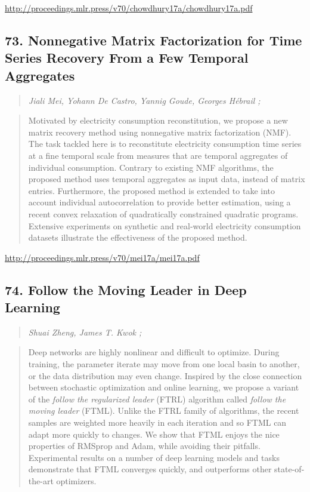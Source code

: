 \documentclass{article}
\begin{document}
\href{http://proceedings.mlr.press/v70/chowdhury17a/chowdhury17a.pdf}{http://proceedings.mlr.press/v70/chowdhury17a/chowdhury17a.pdf}

\subsection{73. Nonnegative Matrix Factorization for Time Series Recovery From a Few Temporal Aggregates}

\begin{quote}
\footnotesize{\textit{Jiali Mei, Yohann De Castro, Yannig Goude, Georges Hébrail ;}}

\end{quote}

\begin{quote}
    Motivated by electricity consumption reconstitution, we propose a new matrix recovery method using nonnegative matrix factorization (NMF). The task tackled here is to reconstitute electricity consumption time series at a fine temporal scale from measures that are temporal aggregates of individual consumption. Contrary to existing NMF algorithms, the proposed method uses temporal aggregates as input data, instead of matrix entries. Furthermore, the proposed method is extended to take into account individual autocorrelation to provide better estimation, using a recent convex relaxation of quadratically constrained quadratic programs. Extensive experiments on synthetic and real-world electricity consumption datasets illustrate the effectiveness of the proposed method.  
\end{quote}

\href{http://proceedings.mlr.press/v70/mei17a/mei17a.pdf}{http://proceedings.mlr.press/v70/mei17a/mei17a.pdf}

\subsection{74. Follow the Moving Leader in Deep Learning}

\begin{quote}
\footnotesize{\textit{Shuai Zheng, James T. Kwok ;}}

\end{quote}

\begin{quote}
    Deep networks are highly nonlinear and difficult to optimize. During training, the parameter iterate may move from one local basin to another, or the data distribution may even change. Inspired by the close connection between stochastic optimization and online learning, we propose a variant of the \textit{follow the regularized leader} (FTRL) algorithm called \textit{follow the moving leader} (FTML). Unlike the FTRL family of algorithms, the recent samples are weighted more heavily in each iteration and so FTML can adapt more quickly to changes. We show that FTML enjoys the nice properties of RMSprop and Adam, while avoiding their pitfalls. Experimental results on a number of deep learning models and tasks demonstrate that FTML converges quickly, and outperforms other state-of-the-art optimizers.  
\end{quote}
\end{document}
